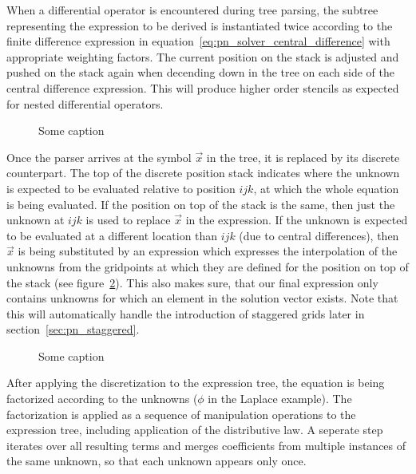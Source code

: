 When a differential operator is encountered during tree parsing, the subtree representing the expression to be derived is instantiated twice according to the finite difference expression in equation~\ref{eq:pn_solver_central_difference} with appropriate weighting factors. The current position on the stack is adjusted and pushed on the stack again when decending down in the tree on each side of the central difference expression. This will produce higher order stencils as expected for nested differential operators.
\begin{figure}[h]
\centering
{}
\caption{Some caption}
\label{fig:pn_discretization_differential}
\end{figure}

Once the parser arrives at the symbol $\vec{x}$ in the tree, it is replaced by its discrete counterpart. The top of the discrete position stack indicates where the unknown is expected to be evaluated relative to position $ijk$, at which the whole equation is being evaluated. If the position on top of the stack is the same, then just the unknown at $ijk$ is used to replace $\vec{x}$ in the expression. If the unknown is expected to be evaluated at a different location than $ijk$ (due to central differences), then $\vec{x}$ is being substituted by an expression which expresses the interpolation of the unknowns from the gridpoints at which they are defined for the position on top of the stack (see figure~\ref{fig:pn_discretization_interpolation}). This also makes sure, that our final expression only contains unknowns for which an element in the solution vector exists. Note that this will automatically handle the introduction of staggered grids later in section~\ref{sec:pn_staggered}.
\begin{figure}[h]
\centering
{}
\caption{Some caption}
\label{fig:pn_discretization_interpolation}
\end{figure}

After applying the discretization to the expression tree, the equation is being factorized according to the unknowns ($\phi$ in the Laplace example). The factorization is applied as a sequence of manipulation operations to the expression tree, including application of the distributive law. A seperate step iterates over all resulting terms and merges coefficients from multiple instances of the same unknown, so that each unknown appears only once. 

